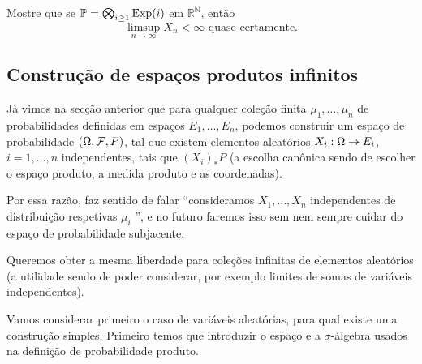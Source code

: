 \begin{exercise}
  Mostre que se $\mathbb{P} = \bigotimes_{i \geq 1} \operatorname{Exp}(i)$ em $\mathbb{R}^\mathbb{N}$, então
  \begin{equation}
    \text{$\limsup_{n\to \infty} X_n < \infty$ quase certamente.}
  \end{equation}
\end{exercise}

\begin{topics}


\section{Construção de espaços produtos infinitos}


Jà vimos na secção anterior que para qualquer coleção finita  $\mu_1,\dots,\mu_n$ de probabilidades definidas em espaços
$E_1,\dots,E_n$, podemos construir um espaço de probabilidade $(\Omega,{\mathcal F},P)$, tal que existem elementos aleatórios $X_i:\Omega\to E_i$,
$i=1,\dots,n$ independentes, tais que $(X_i)_*P$ (a escolha canônica sendo de escolher o espaço produto, a medida produto e as coordenadas).

\medskip

Por essa razão, faz sentido de falar ``consideramos $X_1,\dots,X_n$ independentes de distribuição respetivas $\mu_i$ '', e
no futuro faremos isso sem nem sempre cuidar do
espaço de probabilidade subjacente.

\medskip

Queremos obter a mesma liberdade para coleções infinitas de elementos aleatórios
(a utilidade sendo de poder considerar, por exemplo limites de somas de variáveis independentes).

\medskip

Vamos considerar primeiro o caso de variáveis aleatórias, para qual existe uma construção simples.
Primeiro temos que introduzir o espaço e a $\sigma$-álgebra usados na definição de probabilidade produto.


\end{topics}
